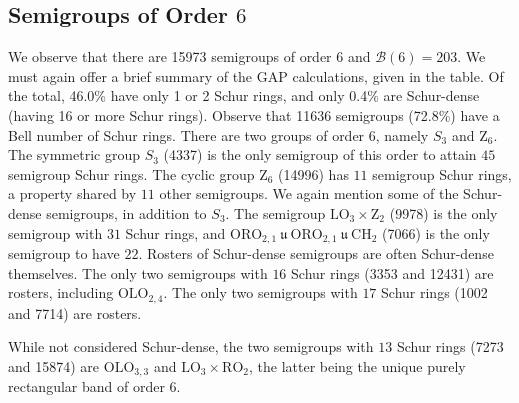 \documentclass{article}
\theoremstyle{plain}
\theoremstyle{definition}
\newcommand{\B}{\mathscr{B}}
\newcommand{\LO}{\mathrm{LO}}
\newcommand{\RO}{\mathrm{RO}}
\newcommand{\ORO}{\mathrm{ORO}}
\newcommand{\OLO}{\mathrm{OLO}}
\newcommand{\CH}{\mathrm{CH}}
\newcommand{\z}{\mathrm{Z}}
\renewcommand{\u}{\ \mathfrak{u}\ }
\begin{document}
\subsection{Semigroups of Order $6$}
We observe that there are 15973 semigroups of order $6$ and $\B(6)=203$. We must again offer a brief summary of the GAP calculations, given in the table. Of the total, 46.0\% have only 1 or 2 Schur rings, and only 0.4\% are Schur-dense (having 16 or more Schur rings). Observe that 11636 semigroups (72.8\%) have a Bell number of Schur rings. There are two groups of order $6$, namely $S_3$ and $\z_6$. The symmetric group $S_3$ (4337) is the only semigroup of this order to attain $45$ semigroup Schur rings. The cyclic group $\z_6$ (14996) has $11$ semigroup Schur rings, a property shared by $11$ other semigroups. We again mention some of the Schur-dense semigroups, in addition to $S_3$.  The semigroup $\LO_3\times \z_2$ (9978) is the only semigroup with $31$ Schur rings, and $\ORO_{2,1}\u \ORO_{2,1} \u \CH_2$ (7066) is the only semigroup to have $22$. Rosters of Schur-dense semigroups are often Schur-dense themselves. The only two semigroups with $16$ Schur rings (3353 and 12431) are rosters, including $\OLO_{2,4}$. The only two semigroups with $17$ Schur rings (1002 and 7714) are rosters.

While not considered Schur-dense, the two semigroups with $13$ Schur rings (7273 and 15874) are $\OLO_{3,3}$ and $\LO_3\times \RO_2$, the latter being the unique purely rectangular band of order $6$. 

\end{document}
